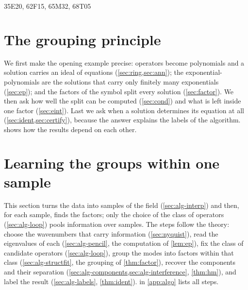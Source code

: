 \begin{MSCcodes}
35E20, 62F15, 65M32, 68T05
\end{MSCcodes}



\section{The grouping principle}\label{sec:theory}
We first make the opening example precise: operators become polynomials and a solution carries an ideal of equations
(\cref{sec:ring,sec:ann}); the exponential-polynomials are the solutions that carry only finitely many exponentials
(\cref{sec:ep}); and the factors of the symbol split every solution (\cref{sec:factor}). We then ask how well the split
can be computed (\cref{sec:cond}) and what is left inside one factor (\cref{sec:eint}). Last we ask when a solution
determines its equation at all (\cref{sec:ident,sec:certify}), because the answer explains the labels of the algorithm.
 shows how the results depend on each other.









\section{Learning the groups within one sample}\label{sec:within}
\label{sec:algorithm}
This section turns the data into samples of the field (\cref{sec:alg-interp}) and then, for each sample, finds the
factors; only the choice of the class of operators (\cref{sec:alg-loop}) pools information over samples. The steps
follow the theory: choose the
wavenumbers that carry information (\cref{sec:nyquist}), read the eigenvalues of each (\cref{sec:alg-pencil}, the
computation of \cref{lem:ep}), fix the class of candidate operators (\cref{sec:alg-loop}), group the modes into factors
within that class (\cref{sec:alg-structfit}, the grouping of \cref{thm:factor}), recover the components and their separation
(\cref{sec:alg-components,sec:alg-interference}, \cref{thm:hm}), and label the result (\cref{sec:alg-labels},
\cref{thm:ident}).  in \cref{app:algo} lists all steps.






